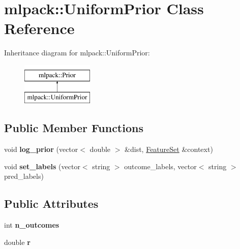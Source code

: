 \hypertarget{classmlpack_1_1_uniform_prior}{
\section{mlpack::UniformPrior Class Reference}
\label{classmlpack_1_1_uniform_prior}
}
Inheritance diagram for mlpack::UniformPrior:\begin{figure}[H]
\begin{center}
\leavevmode
\includegraphics[height=2.000000cm]{classmlpack_1_1_uniform_prior}
\end{center}
\end{figure}
\subsection*{Public Member Functions}
\begin{DoxyCompactItemize}
\item 
\hypertarget{classmlpack_1_1_uniform_prior_a2c449695fbb3005563e3898dd578239c}{
void {\bfseries log\_\-prior} (vector$<$ double $>$ \&dist, \hyperlink{structmlpack_1_1_feature_set}{FeatureSet} \&context)}
\label{classmlpack_1_1_uniform_prior_a2c449695fbb3005563e3898dd578239c}

\item 
\hypertarget{classmlpack_1_1_uniform_prior_ac6dbf3c0036c3da9549e7923b6e86f61}{
void {\bfseries set\_\-labels} (vector$<$ string $>$ outcome\_\-labels, vector$<$ string $>$ pred\_\-labels)}
\label{classmlpack_1_1_uniform_prior_ac6dbf3c0036c3da9549e7923b6e86f61}

\end{DoxyCompactItemize}
\subsection*{Public Attributes}
\begin{DoxyCompactItemize}
\item 
\hypertarget{classmlpack_1_1_uniform_prior_a0879fed0e11bea4b5e64b7d5620ab360}{
int {\bfseries n\_\-outcomes}}
\label{classmlpack_1_1_uniform_prior_a0879fed0e11bea4b5e64b7d5620ab360}

\item 
\hypertarget{classmlpack_1_1_uniform_prior_abdad93d521111dc6b8b9928b0dd286d0}{
double {\bfseries r}}
\label{classmlpack_1_1_uniform_prior_abdad93d521111dc6b8b9928b0dd286d0}

\end{DoxyCompactItemize}
